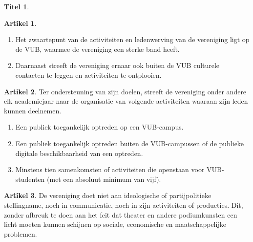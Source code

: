 \documentclass[a4paper,10pt]{article}
\theoremstyle{definition}
\newtheorem{titel}{\newline\Large Titel}
\newtheorem{artikel}{\large Artikel}
\newcommand{\ttextcr}{\hfill\newline}
\newcommand{\ttextenum}{\mbox{}}
\begin{document}
\begin{titel}
  \begin{artikel}\ttextenum
    \begin{enumerate}
      \item
        Het zwaartepunt van de activiteiten en ledenwerving van de vereniging ligt op de VUB, waarmee de vereniging een sterke band heeft.
      \item
        Daarnaast streeft de vereniging ernaar ook buiten de VUB culturele contacten te leggen en activiteiten te ontplooien.
    \end{enumerate}
  \end{artikel}

  \begin{artikel}\ttextcr
    Ter ondersteuning van zijn doelen, streeft de vereniging onder andere elk academiejaar naar de organisatie van volgende activiteiten waaraan zijn leden kunnen deelnemen.
    \begin{enumerate}
      \item Een publiek toegankelijk optreden op een VUB-campus.
      \item Een publiek toegankelijk optreden buiten de VUB-campussen of de publieke digitale beschikbaarheid van een optreden.
      \item Minstens tien samenkomsten of activiteiten die openstaan voor VUB-studenten (met een absoluut minimum van vijf).
    \end{enumerate}
  \end{artikel}

  \begin{artikel}\ttextcr
    De vereniging doet niet aan ideologische of partijpolitieke stellingname, noch in communicatie, noch in zijn activiteiten of producties.
    Dit, zonder afbreuk te doen aan het feit dat theater en andere podiumkunsten een licht moeten kunnen schijnen op sociale, economische en maatschappelijke problemen.
  \end{artikel}

\end{titel}

\end{document}
